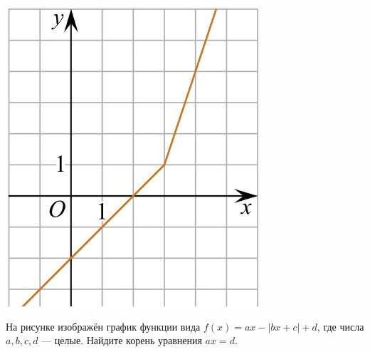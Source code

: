 \begin{homework}[number=2]
\begin{listofex}
\begin{minipage}[c]{0.1\textwidth}
			\includegraphics[align=t, width=\textwidth]{pics/G101M4C5-8.jpg}
		\end{minipage}
		\item
		\begin{minipage}[t]{0.43\textwidth}
			На рисунке изображён график функции вида \(f(x)=ax-|bx+c|+d\), где числа \(a, b, c, d\) --- целые. Найдите корень уравнения \(ax=d\).
		\end{minipage}
		\begin{minipage}[c]{0.1\textwidth}

\end{minipage}
\end{listofex}
\end{homework}
